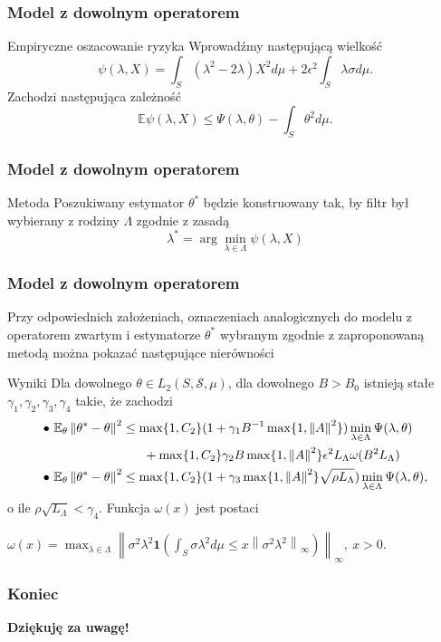 \documentclass{beamer}
\newcommand{\norm}[1]{\left\lVert#1\right\rVert}
\begin{document}
\begin{frame}\frametitle{Model z dowolnym operatorem}
\begin{block}{Empiryczne oszacowanie ryzyka}
Wprowadźmy następującą wielkość
\begin{displaymath}
\psi(\lambda,X)=\int_S(\lambda^2-2\lambda)X^2 d\mu+ 2\epsilon^2\int_S\lambda\sigma d\mu.
\end{displaymath}
Zachodzi następująca zależność
\begin{displaymath}
\mathbb{E}\psi (\lambda,X)\leq \Psi(\lambda,\theta)-\int_S\theta^2d\mu.
\end{displaymath}
\end{block}
\end{frame}


\begin{frame}\frametitle{Model z dowolnym operatorem}
\begin{block}{Metoda}
Poszukiwany estymator $\theta^*$ będzie konstruowany tak, by filtr był wybierany z rodziny $\Lambda$ zgodnie z zasadą
\begin{displaymath}
\lambda^*=\arg\min_{\lambda\in \Lambda}\psi(\lambda,X)
\end{displaymath}
\end{block}
\end{frame}

\begin{frame}\frametitle{Model z dowolnym operatorem}
\begin{center}
\tiny{
Przy odpowiednich założeniach, oznaczeniach analogicznych do modelu z operatorem zwartym i estymatorze $\theta^*$ wybranym zgodnie z zaproponowaną metodą można pokazać następujące nierówności}
\end{center}
\begin{block}{Wyniki}
\scriptsize{Dla dowolnego $\theta\in L_2(S,\mathcal{S},\mu)$, dla dowolnego $B>B_0$ istnieją stałe $\gamma_1, \gamma_2,\gamma_3, \gamma_4$ takie, że zachodzi}
\small{\begin{displaymath}
\begin{split}
\bullet\ \mathbb{E}_{\theta}&\norm{\theta^*-\theta}^2 \leq \max \{1,C_2\}(1+\gamma_1B^{-1}\max\{1,\norm{A}^2\})\min_{\lambda\in \Lambda}\Psi(\lambda,\theta)\\
 &\hspace{21mm} + \max \{1,C_2\}\gamma_2B\max\{1,\norm{A}^2\}\epsilon^2L_{\Lambda}\omega(B^2L_{\Lambda})\\
\bullet\ \mathbb{E}_{\theta}&\norm{\theta^*-\theta}^2\leq \max \{1,C_2\}(1+\gamma_3\max\{1,\norm{A}^2\}\sqrt{ \rho L_{\Lambda}})\min_{\lambda\in \Lambda}\Psi(\lambda,\theta),
\end{split}
\end{displaymath}}
\scriptsize{o ile $\rho\sqrt{L_{\Lambda}}<\gamma_4$. Funkcja $\omega(x)$ jest postaci}
\small{\begin{center}
$
\omega(x)=\max_{\lambda\in \Lambda}\norm{\sigma^2\lambda^2\pmb{1}\left(\int_S\sigma\lambda^2d\mu\leq x \norm{\sigma^2\lambda^2}_{\infty}\right)}_{\infty},\ x>0.$
\end{center}}
\end{block}
\end{frame}




\begin{frame}\frametitle{Koniec}
\begin{center}
\huge{\textbf{Dziękuję za uwagę!}}
\end{center}
\end{frame}
\end{document}
